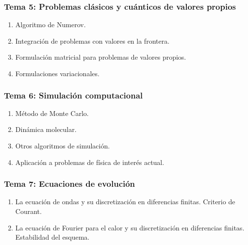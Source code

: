 \documentclass[12pt]{beamer}
\begin{document}
\begin{frame}
\frametitle{\textbf{Tema 5: Problemas cl\'{a}sicos y cu\'{a}nticos de valores propios}}
\begin{enumerate}
\item Algoritmo de Numerov.
\item Integraci\'{o}n de problemas con valores en la frontera.
\item Formulaci\'{o}n matricial para problemas de valores propios.
\item Formulaciones variacionales.
\end{enumerate}
\end{frame}
\begin{frame}
\frametitle{\textbf{Tema 6: Simulaci\'{o}n computacional}}
\begin{enumerate}
\item M\'{e}todo de Monte Carlo.
\item Din\'{a}mica molecular.
\item Otros algoritmos de simulaci\'{o}n.
\item Aplicaci\'{o}n a problemas de f\'{i}sica de inter\'{e}s actual.
\end{enumerate}
\end{frame}
\begin{frame}
\frametitle{\textbf{Tema 7: Ecuaciones de evoluci\'{o}n}}
\begin{enumerate}
\item La ecuaci\'{o}n de ondas y su discretizaci\'{o}n en diferencias finitas. Criterio de Courant.
\item La ecuaci\'{o}n de Fourier para el calor y su discretizaci\'{o}n en diferencias finitas. Estabilidad del esquema.
\end{enumerate}
\end{frame}
\end{document}
